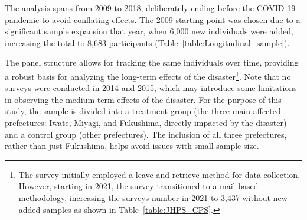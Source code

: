 \documentclass[a4paper,12pt]{article}
\begin{document}
The analysis spans from 2009 to 2018, deliberately ending before the COVID-19 pandemic to avoid conflating effects. The 2009 starting point was chosen due to a significant sample expansion that year, when 6,000 new individuals were added, increasing the total to 8,683 participants (Table~\ref{table:Longitudinal_sample}).

The panel structure allows for tracking the same individuals over time, providing a robust basis for analyzing the long-term effects of the disaster\footnote{The survey initially employed a leave-and-retrieve method for data collection. However, starting in 2021, the survey transitioned to a mail-based methodology, increasing the surveys number in 2021 to 3,437 without new added samples as shown in Table~\ref{table:JHPS_CPS}.}. Note that no surveys were conducted in 2014 and 2015, which may introduce some limitations in observing the medium-term effects of the disaster. For the purpose of this study, the sample is divided into a treatment group (the three main affected prefectures: Iwate, Miyagi, and Fukushima, directly impacted by the disaster) and a control group (other prefectures). The inclusion of all three prefectures, rather than just Fukushima, helps avoid issues with small sample size.


\end{document}
